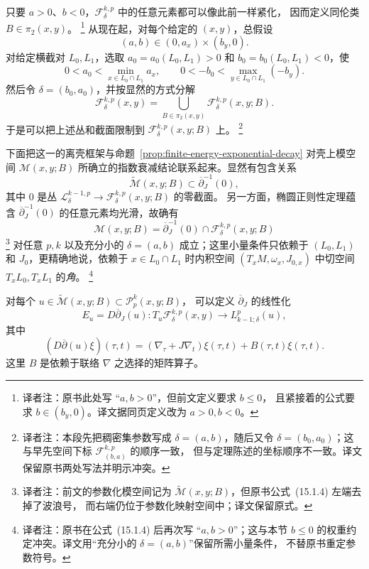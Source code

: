 只要 $a>0$、$b<0$，$\mathcal F_\delta^{k,p}$ 中的任意元素都可以像此前一样紧化，
因而定义同伦类 $B\in\pi_2(x,y)$。
\footnote{译者注：原书此处写 ``$a,b>0$''，但前文定义要求 $b\leq0$，
且紧接着的公式要求 $b\in(b_y,0)$。译文据同页定义改为 $a>0,b<0$。}
从现在起，对每个给定的 $(x,y)$，总假设
\begin{equation}
 (a,b)\in(0,a_x)\times(b_y,0).
 \label{eq:admissible-weight-range}
\end{equation}
对给定横截对 $L_0,L_1$，选取 $a_0=a_0(L_0,L_1)>0$ 和
$b_0=b_0(L_0,L_1)<0$，使
\[
 0<a_0<\min_{x\in L_0\cap L_1}a_x,
 \qquad
 0<-b_0<\max_{y\in L_0\cap L_1}(-b_y).
\]
然后令 $\delta=(b_0,a_0)$，并按显然的方式分解
\[
 \mathcal F_\delta^{k,p}(x,y)
 =\bigcup_{B\in\pi_2(x,y)}\mathcal F_\delta^{k,p}(x,y;B).
\]
于是可以把上述\personBanach{}丛和截面限制到 $\mathcal F_\delta^{k,p}(x,y;B)$ 上。
\footnote{译者注：本段先把稠密集参数写成 $\delta=(a,b)$，随后又令
$\delta=(b_0,a_0)$；这与早先空间下标 $\mathcal F_{(b,a)}^{k,p}$ 的顺序一致，
但与定理陈述的坐标顺序不一致。译文保留原书两处写法并明示冲突。}

下面把这一\termWeightedSobolevSpace{}的离壳框架与命题~\ref{prop:finite-energy-exponential-decay}
对壳上模空间 $\mathcal M(x,y;B)$ 所确立的指数衰减结论联系起来。显然有包含关系
\[
 \widetilde{\mathcal M}(x,y;B)\subset\overline\partial_J^{-1}(0),
\]
其中 $0$ 是丛
$\mathcal L_\delta^{k-1,p}\to\mathcal F_\delta^{k,p}(x,y;B)$ 的零截面。
另一方面，椭圆正则性定理蕴含 $\overline\partial_J^{-1}(0)$ 的任意元素均光滑，故确有
\begin{equation}
 \mathcal M(x,y;B)
 =\overline\partial_J^{-1}(0)\cap\mathcal F_\delta^{k,p}(x,y;B)
 \label{eq:on-shell-as-zero-set}
\end{equation}
\footnote{译者注：前文的参数化模空间记为
$\widetilde{\mathcal M}(x,y;B)$，但原书公式~(15.1.4) 左端去掉了波浪号，
而右端仍位于参数化映射空间中；译文保留原式。}
对任意 $p,k$ 以及充分小的 $\delta=(a,b)$ 成立；这里小量条件只依赖于
$(L_0,L_1)$ 和 $J_0$，更精确地说，依赖于 $x\in L_0\cap L_1$ 时\personHermitian{}内积空间 $(T_xM,\omega_x,J_{0,x})$ 中切空间 $T_xL_0,T_xL_1$
的\emph{\personLagrange{}角}。
\footnote{译者注：原书在公式~(15.1.4) 后再次写 ``$a,b>0$''；这与本节
$b\leq0$ 的权重约定冲突。译文用“充分小的 $\delta=(a,b)$”保留所需小量条件，
不替原书重定参数符号。}

对每个 $u\in\widetilde{\mathcal M}(x,y;B)\subset\mathcal P_p^k(x,y;B)$，
可以定义 $\overline\partial_J$ 的线性化
\[
 E_u=D\overline\partial_J(u):T_u\mathcal F_\delta^{k,p}(x,y)
 \longrightarrow L^p_{k-1;\delta}(u),
\]
其中
\[
 (D\overline\partial(u)\xi)(\tau,t)
 =(\nabla_\tau+J\nabla_t)\xi(\tau,t)+B(\tau,t)\xi(\tau,t).
\]
这里 $B$ 是依赖于联络 $\nabla$ 之选择的矩阵算子。

